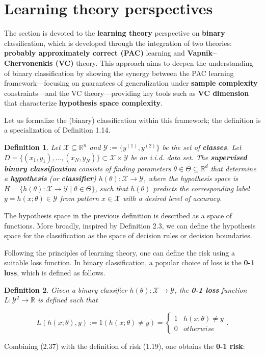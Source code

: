 \documentclass{report}
\newtheorem{definition}{Definition}[chapter]
\begin{document}
\section{Learning theory perspectives}
The section is devoted to the \textbf{learning theory} perspective on \textbf{binary} classification, which is developed through the integration of two theories: \textbf{probably approximately correct (PAC)} learning and \textbf{Vapnik–Chervonenkis (VC)} theory. This approach aims to deepen the understanding of binary classification by showing the synergy between the PAC learning framework—focusing on guarantees of generalization under \textbf{sample complexity} constraints—and the VC theory—providing key tools such as \textbf{VC dimension} that characterize \textbf{hypothesis space complexity}.

Let us formalize the (binary) classification within this framework; the definition is a specialization of Definition 1.14.

\begin{definition}
Let $\mathcal{X} \subseteq \mathbb{R}^n$ and $\mathcal{Y} := \{y^{(1)}, y^{(2)}\}$ be the set of \textbf{classes}. Let $D = \{(x_1,y_1), \dots, (x_N,y_N)\} \subset \mathcal{X} \times \mathcal{Y}$ be an i.i.d. data set. The \textbf{supervised binary classification} consists of finding parameters $\theta \in \Theta \subseteq \mathbb{R}^d$ that determine a \textbf{hypothesis} (or \textbf{classifier}) $h(\theta) : \mathcal{X} \to \mathcal{Y}$, where the hypothesis space is $H = \{h(\theta) : \mathcal{X} \to \mathcal{Y} \mid \theta \in \Theta\}$, such that $h(\theta)$ predicts the corresponding label $y = h(x;\theta) \in \mathcal{Y}$ from pattern $x \in \mathcal{X}$ with a desired level of accuracy.
\end{definition}
The hypothesis space in the previous definition is described as a space of functions. More broadly, inspired by Definition 2.3, we can define the hypothesis space for the classification as the space of decision rules or decision boundaries.

Following the principles of learning theory, one can define the risk using a suitable loss function. In binary classification, a popular choice of loss is the \textbf{0-1 loss}, which is defined as follows.

\begin{definition}
Given a binary classifier $h(\theta) : \mathcal{X} \to \mathcal{Y}$, the \textbf{0-1 loss} function $L : \mathcal{Y} ^ 2 \to \mathbb{R}$ is defined such that

\begin{equation}
L(h(x;\theta), y) := 1(h(x;\theta) \neq y) = \left\{\begin{matrix}
1 &  h(x;\theta) \neq y \\
0 & otherwise
\end{matrix}\right..
\end{equation}
\end{definition}
Combining (2.37) with the definition of risk (1.19), one obtains the \textbf{0-1 risk}:
\end{document}
